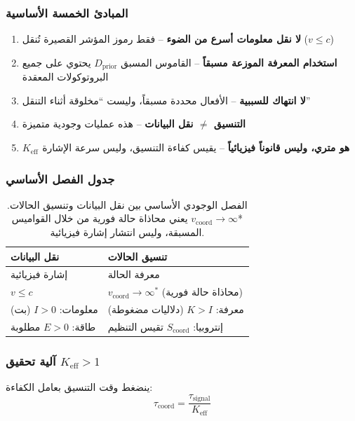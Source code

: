 \documentclass[11pt,a4paper]{article}
\begin{document}
	\subsubsection{المبادئ الخمسة الأساسية}
	\begin{enumerate}[leftmargin=*]
		\item \textbf{لا نقل معلومات أسرع من الضوء} – فقط رموز المؤشر القصيرة تُنقل ($v \leq c$)
		\item \textbf{استخدام المعرفة الموزعة مسبقاً} – القاموس المسبق $D_{\text{prior}}$ يحتوي على جميع البروتوكولات المعقدة
		\item \textbf{لا انتهاك للسببية} – الأفعال محددة مسبقاً، وليست ``مخلوقة أثناء التنقل''
		\item \textbf{التنسيق $\neq$ نقل البيانات} – هذه عمليات وجودية متميزة
		\item \textbf{$K_{\mathrm{eff}}$ هو متري، وليس قانوناً فيزيائياً} – يقيس كفاءة التنسيق، وليس سرعة الإشارة
	\end{enumerate}
	
	\subsubsection{جدول الفصل الأساسي}
	\begin{table}[H]
		\centering
		\begin{english}
			\begin{tabular}{|p{0.45\textwidth}|p{}|}
				\hline
				\textbf{نقل البيانات} & \textbf{تنسيق الحالات} \\
				\hline
				إشارة فيزيائية & معرفة الحالة \\
				$v \leq c$ & $v_{\text{coord}} \to \infty^*$ (محاذاة حالة فورية) \\
				معلومات: $I > 0$ (بت) & معرفة: $K > I$ (دلاليات مضغوطة) \\
				طاقة: $E > 0$ مطلوبة & إنتروبيا: $S_{\text{coord}}$ تقيس التنظيم \\
				\hline
			\end{tabular}
		\end{english}
		\caption{الفصل الوجودي الأساسي بين نقل البيانات وتنسيق الحالات. *$v_{\text{coord}} \to \infty$ يعني محاذاة حالة فورية من خلال القواميس المسبقة، وليس انتشار إشارة فيزيائية.}
		\label{tab:coordination-vs-data}
	\end{table}
	
	\subsubsection{آلية تحقيق $K_{\mathrm{eff}} > 1$}
	ينضغط وقت التنسيق بعامل الكفاءة:
	\begin{equation}
		\tau_{\text{coord}} = \frac{\tau_{\text{signal}}}{K_{\mathrm{eff}}}
	\end{equation}
	
\end{document}
